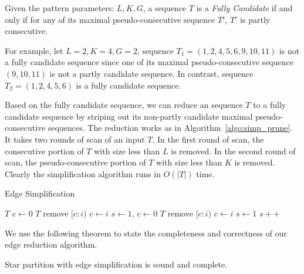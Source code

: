 \begin{definition}
Given the pattern parameters: $L,K,G$, a sequence $T$ is a \emph{Fully Candidate} 
if and only if for any of its maximal pseudo-consecutive sequence $T'$, $T'$ 
is partly consecutive.
\end{definition}

For example, let $L = 2, K = 4, G = 2$, sequence $T_1=(1,2,4,5,6,9,10,11)$ is 
not a fully candidate sequence since one of its maximal pseudo-consecutive sequence $(9,10,11)$
is not a partly candidate sequence. In contrast, sequence $T_2=(1,2,4,5,6)$ is 
a fully candidate sequence.

Based on the fully candidate sequence, we can reduce an sequence $T$ to a 
fully candidate sequence by striping out its non-partly candidate maximal pseudo-consecutive 
sequences. The reduction works as in Algorithm~\ref{algo:simp_prune}. It takes two
rounds of scan of an input $T$. In the first round of scan,
the consecutive portion of $T$ with size less than $L$ is removed.
In the second round of scan, the pseudo-consecutive portion of $T$ with size less than $K$
is removed. Clearly the simplification algorithm runs in $O(|T|)$ time.

\begin{algorithm}
\caption{Edge Simplification}
\label{algo:simp_prune}
\begin{algorithmic}
\Require $T$
\State $c \gets 0$
			\State $T$ remove $[c:i)$
		\EndIf
		\State $c \gets i$
	\EndIf
\EndFor
{}
\State $s\gets 1$, $c\gets 0$
			\State $T$ remove $[c:i)$
		\EndIf
		\State $c \gets i$
		\State $s \gets 1$
	\Else
		\State $s++$
	\EndIf
\EndFor
\end{algorithmic}
\end{algorithm}

We use the following theorem to state the completeness and correctness of our 
edge reduction algorithm.
\begin{theorem}
Star partition with edge simplification is sound and complete.
\end{theorem}

